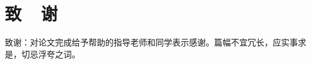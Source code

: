\newpage
{}
{}
\section*{致~~谢}
\vspace*{-2mm}
\setlength{\baselineskip}{25pt}

致谢：对论文完成给予帮助的指导老师和同学表示感谢。篇幅不宜冗长，应实事求是，切忌浮夸之词。